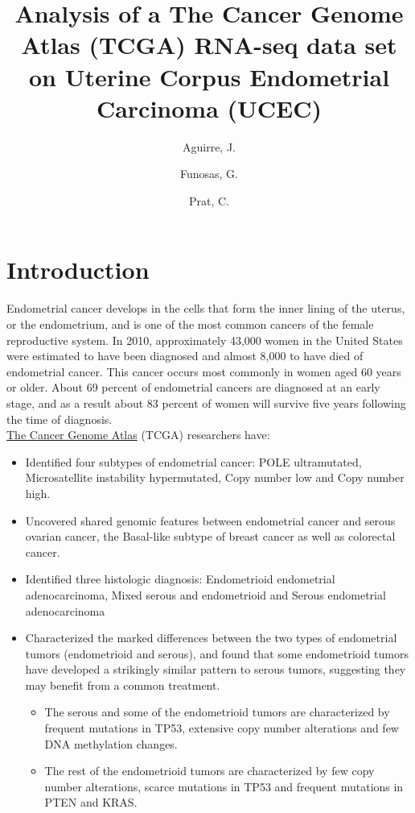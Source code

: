 \documentclass[9pt,twocolumn,twoside]{gsajnl}
\title{Analysis of a The Cancer Genome Atlas (TCGA) RNA-seq data set on Uterine Corpus Endometrial Carcinoma (UCEC)}
\author[$\ast$]{Aguirre, J.}
\author[$\ast$]{Funosas, G.}
\author[$\ast$,1]{Prat, C.}
\affil[$\ast$]{University Pompeu Fabra}
\begin{document}
\maketitle
\thispagestyle{firststyle}
\marginmark
\firstpagefootnote
{}
\vspace{-11pt}%


\section*{Introduction}

Endometrial cancer develops in the cells that form the inner lining of the uterus, or the endometrium, and is one of the most common cancers of the female reproductive system. In 2010, approximately 43,000 women in the United States were estimated to have been diagnosed and almost 8,000 to have died of endometrial cancer. This cancer occurs most commonly in women aged 60 years or older. About 69 percent of endometrial cancers are diagnosed at an early stage, and as a result about 83 percent of women will survive five years following the time of diagnosis.\\
\newline
\href{http://cancergenome.nih.gov/cancersselected/endometrial}{The Cancer Genome Atlas} (TCGA) researchers have:
\begin{itemize}
\item Identified four subtypes of endometrial cancer: POLE ultramutated, Microsatellite instability hypermutated, Copy number low and Copy number high.
\item Uncovered shared genomic features between endometrial cancer and serous ovarian cancer, the Basal-like subtype of breast cancer as well as colorectal cancer.
\item Identified three histologic diagnosis: Endometrioid endometrial adenocarcinoma, Mixed serous and endometrioid and Serous endometrial adenocarcinoma
\item Characterized the marked differences between the two types of endometrial tumors (endometrioid and serous), and found that some endometrioid tumors have developed a strikingly similar pattern to serous tumors, suggesting they may benefit from a common treatment.
\begin{itemize}
\item The serous and some of the endometrioid tumors are characterized by frequent mutations in TP53, extensive copy number alterations and few DNA methylation changes.
\item The rest of the endometrioid tumors are characterized by few copy number alterations, scarce mutations in TP53 and frequent mutations in PTEN and KRAS.
\end{itemize}
\end{itemize}
\end{document}
